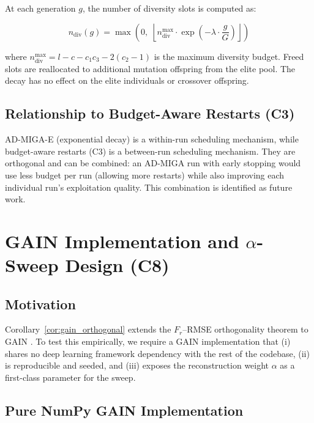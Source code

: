 At each generation $g$, the number of diversity slots is computed as:

\begin{equation}
    n_{\text{div}}(g) = \max\!\left(0,\; \left\lfloor n_{\text{div}}^{\max} \cdot \exp\!\left(-\lambda \cdot \frac{g}{G}\right) \right\rfloor \right)
\end{equation}

where $n_{\text{div}}^{\max} = l - c - c_1 c_3 - 2(c_2 - 1)$ is the maximum diversity budget. Freed slots are reallocated to additional mutation offspring from the elite pool. The decay has no effect on the elite individuals or crossover offspring.

\subsection{Relationship to Budget-Aware Restarts (C3)}

AD-MIGA-E (exponential decay) is a within-run scheduling mechanism, while budget-aware restarts (C3) is a between-run scheduling mechanism. They are orthogonal and can be combined: an AD-MIGA run with early stopping would use less budget per run (allowing more restarts) while also improving each individual run's exploitation quality. This combination is identified as future work.


\section{GAIN Implementation and \texorpdfstring{$\alpha$}{α}-Sweep Design (C8)}
\label{sec:gain_methods}

\subsection{Motivation}

Corollary~\ref{cor:gain_orthogonal} extends the $F_r$--RMSE orthogonality theorem to GAIN \cite{Yoon2018}. To test this empirically, we require a GAIN implementation that (i) shares no deep learning framework dependency with the rest of the codebase, (ii) is reproducible and seeded, and (iii) exposes the reconstruction weight $\alpha$ as a first-class parameter for the sweep.

\subsection{Pure NumPy GAIN Implementation}

